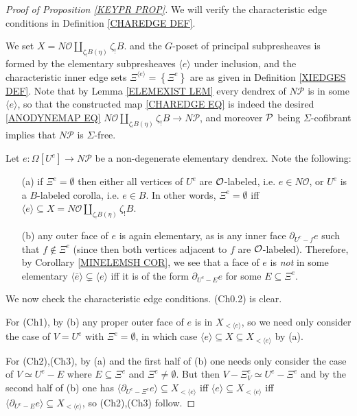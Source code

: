 \documentclass[a4paper,10pt
,draft
]{article}%
\renewcommand{\1}{\eta}%
\begin{document}
\begin{proof}[Proof of Proposition \ref{KEYPR PROP}]

We will verify the characteristic edge conditions in Definition \ref{CHAREDGE DEF}.

We set $X = N \mathcal{O} \amalg_{\zeta_!B (\eta)} \zeta_!B$.  %
and the $G$-poset of principal subpresheaves is formed by the 
 elementary subpresheaves 
$\langle e \rangle$
under inclusion, and the characteristic inner edge sets
$\Xi^{\langle e \rangle} = \left\{\Xi^{e}\right\}$ are as given in Definition \ref{XIEDGES DEF}.
Note that by Lemma \ref{ELEMEXIST LEM}
every dendrex of $N \mathcal{P}$ is in some 
$\langle e \rangle$, so that
the constructed map \eqref{CHAREDGE EQ} is indeed
the desired \eqref{ANODYNEMAP EQ}
$N \mathcal{O} \amalg_{\zeta_!B (\eta)} \zeta_!B \to N \mathcal{P}$,
and moreover $\P$ being $\Sigma$-cofibrant implies that $N \mathcal P$ is $\Sigma$-free. 


Let $e\colon \Omega[U^e] \to N \mathcal{P}$
be a non-degenerate elementary dendrex. Note the following: 
\begin{itemize}
\item[(a)] if $\Xi^e = \emptyset$ then 
either all vertices of $U^e$ are $\O$-labeled, i.e. $e \in N \mathcal{O}$, or $U^e$ is a $B$-labeled corolla, i.e. $e \in B$.
In other words, $\Xi^e = \emptyset$ iff 
$\langle e \rangle \subseteq X = N \mathcal{O} \amalg_{\zeta_!B (\eta)} \zeta_!B$.
\item[(b)] any outer face of $e$ is again elementary,
as is any inner face $\partial_{U^e-f} e$ such that $f \not \in \Xi^e$
(since then both vertices adjacent to $f$ are $\O$-labeled).
Therefore, by Corollary \ref{MINELEMSH COR},
we see that a face of $e$ is \emph{not} in
some elementary $\langle \bar{e} \rangle \subsetneq \langle e \rangle$
iff it is of the form
$\partial_{U^e - E} e$
for some $E \subseteq \Xi^e$.
\end{itemize}


We now check the characteristic edge conditions. (Ch0.2) is clear.

For (Ch1), by (b) any proper outer face of $e$ is in $X_{<\langle e\rangle}$, so we need only consider the case of
$V=U^e$ with $\Xi^e=\emptyset$, in which case
$\langle e \rangle \subseteq X \subseteq X_{<\langle e\rangle}$ by (a).

For (Ch2),(Ch3), by (a) and the first half of (b) one needs only consider the case of
$V \simeq U^e - E$ where $E \subseteq \Xi^e$ and $\Xi^e \neq \emptyset$.
But then
$V - \Xi^e_V \simeq U^e- \Xi^e$
and by the second half of (b)
one has
$\langle \partial_{U^e-\Xi^e}e \rangle \subseteq  X_{<\langle e\rangle}$
iff
$\langle e \rangle \subseteq  X_{<\langle e\rangle}$
iff
$\langle \partial_{U^e-E}e \rangle \subseteq  X_{<\langle e\rangle}$,
so (Ch2),(Ch3) follow.




\end{proof}
\end{document}
